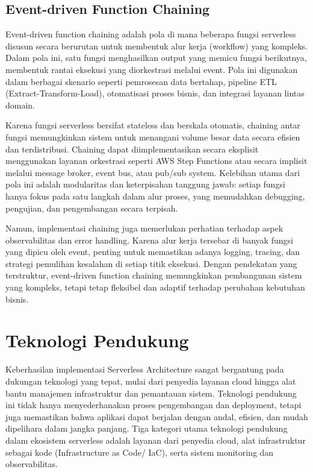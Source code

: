 \subsection{Event-driven Function Chaining}

Event-driven function chaining adalah pola di mana beberapa fungsi serverless disusun secara berurutan untuk membentuk alur kerja (workflow) yang kompleks. Dalam pola ini, satu fungsi menghasilkan output yang memicu fungsi berikutnya, membentuk rantai eksekusi yang diorkestrasi melalui event. Pola ini digunakan dalam berbagai skenario seperti pemrosesan data bertahap, pipeline ETL (Extract-Transform-Load), otomatisasi proses bisnis, dan integrasi layanan lintas domain.

Karena fungsi serverless bersifat stateless dan berskala otomatis, chaining antar fungsi memungkinkan sistem untuk menangani volume besar data secara efisien dan terdistribusi. Chaining dapat diimplementasikan secara eksplisit menggunakan layanan orkestrasi seperti AWS Step Functions atau secara implisit melalui message broker, event bus, atau pub/sub system. Kelebihan utama dari pola ini adalah modularitas dan keterpisahan tanggung jawab: setiap fungsi hanya fokus pada satu langkah dalam alur proses, yang memudahkan debugging, pengujian, dan pengembangan secara terpisah.

Namun, implementasi chaining juga memerlukan perhatian terhadap aspek observabilitas dan error handling. Karena alur kerja tersebar di banyak fungsi yang dipicu oleh event, penting untuk memastikan adanya logging, tracing, dan strategi pemulihan kesalahan di setiap titik eksekusi. Dengan pendekatan yang terstruktur, event-driven function chaining memungkinkan pembangunan sistem yang kompleks, tetapi tetap fleksibel dan adaptif terhadap perubahan kebutuhan bisnis.

\section{Teknologi Pendukung}

Keberhasilan implementasi Serverless Architecture sangat bergantung pada dukungan teknologi yang tepat, mulai dari penyedia layanan cloud hingga alat bantu manajemen infrastruktur dan pemantauan sistem. Teknologi pendukung ini tidak hanya menyederhanakan proses pengembangan dan deployment, tetapi juga memastikan bahwa aplikasi dapat berjalan dengan andal, efisien, dan mudah dipelihara dalam jangka panjang. Tiga kategori utama teknologi pendukung dalam ekosistem serverless adalah layanan dari penyedia cloud, alat infrastruktur sebagai kode (Infrastructure as Code/ IaC), serta sistem monitoring dan observabilitas.

